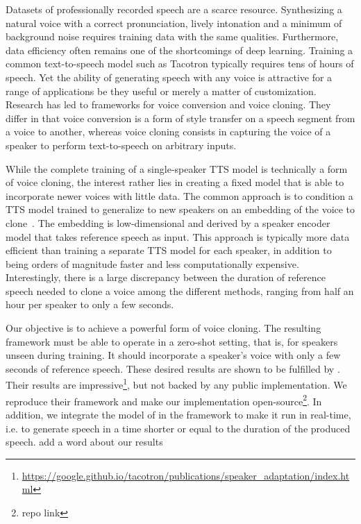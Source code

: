 \documentclass[a4paper, oneside, 12pt, english]{article}
\begin{document}
Datasets of professionally recorded speech are a scarce resource. Synthesizing a natural voice with a correct pronunciation, lively intonation and a minimum of background noise requires training data with the same qualities. Furthermore, data efficiency often remains one of the shortcomings of deep learning. Training a common text-to-speech model such as Tacotron \citep{Tacotron1} typically requires tens of hours of speech. %
Yet the ability of generating speech with any voice is attractive for a range of applications be they useful or merely a matter of customization. Research has led to frameworks for voice conversion and voice cloning. They differ in that voice conversion is a form of style transfer on a speech segment from a voice to another, whereas voice cloning consists in capturing the voice of a speaker to perform text-to-speech on arbitrary inputs. 

While the complete training of a single-speaker TTS model is technically a form of voice cloning, the interest rather lies in creating a fixed model that is able to incorporate newer voices with little data. The common approach is to condition a TTS model trained to generalize to new speakers on an embedding of the voice to clone~\citep{DeepVoice2, CloningFewSamples, SV2TTS}. The embedding is low-dimensional and derived by a speaker encoder model that takes reference speech as input. This approach is typically more data efficient than training a separate TTS model for each speaker, in addition to being orders of magnitude faster and less computationally expensive. Interestingly, there is a large discrepancy between the duration of reference speech needed to clone a voice among the different methods, ranging from half an hour per speaker to only a few seconds.

Our objective is to achieve a powerful form of voice cloning. The resulting framework must be able to operate in a zero-shot setting, that is, for speakers unseen during training. It should incorporate a speaker's voice with only a few seconds of reference speech. These desired results are shown to be fulfilled by \citep{SV2TTS}. Their results are impressive\footnote{\url{https://google.github.io/tacotron/publications/speaker_adaptation/index.html}}, but not backed by any public implementation. We reproduce their framework and make our implementation open-source\footnote{\color{red} repo link}. In addition, we integrate the model of \citep{WaveRNN} in the framework to make it run in real-time, i.e. to generate speech in a time shorter or equal to the duration of the produced speech. \color{red} add a word about our results \color{black}
\end{document}
